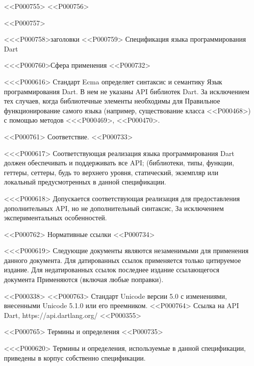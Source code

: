 <<P000755>
<<P000756>

<<P000757>

<<<P000758>{заголовки}
<<P000759> Спецификация языка программирования Dart


<<<P000760>{Сфера применения}
<<P000732>

<<<P000616>%
Стандарт Ecma определяет синтаксис и семантику
Язык программирования Dart.
В нем не указаны API библиотек Dart.
За исключением тех случаев, когда библиотечные элементы необходимы для
Правильное функционирование самого языка
(например, существование класса <<P000468>) с помощью методов
<<<P000469>, <<P000470>.


<<P000761> Соответствие.
<<P000733>

<<<P000617>%
Соответствующая реализация языка программирования Dart
должен обеспечивать и поддерживать все API;
(библиотеки, типы, функции, геттеры, сеттеры,
будь то верхнего уровня, статический, экземпляр или локальный
предусмотренных в данной спецификации.

<<<P000618>%
Допускается соответствующая реализация для предоставления дополнительных API,
но не дополнительный синтаксис,
За исключением экспериментальных особенностей.


<<P000762> Нормативные ссылки
<<P000734>

<<<P000619>%
Следующие документы являются незаменимыми для
применения данного документа.
Для датированных ссылок применяется только цитируемое издание.
Для недатированных ссылок последнее издание ссылающегося документа
Применяются (включая любые поправки).

<<P000338>
<<P000763>
Стандарт Unicode версии 5.0 с изменениями, внесенными Unicode 5.1.0 или его преемником.
<<P000764>
Ссылка на API Dart, https://api.dartlang.org/
<<P000355>


<<P000765> Термины и определения
<<P000735>

<<<P000620>%
Термины и определения, используемые в данной спецификации, приведены в
корпус собственно спецификации.


